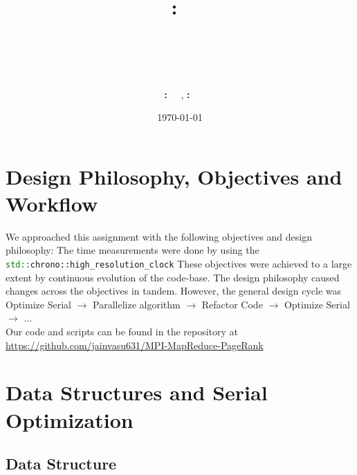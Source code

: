 \documentclass{article}
\title{
    \textmd{\hmwkClass :\ \hmwkClassTitle}\\
    \vspace{2in}
    \textmd{\textbf{\hmwkTitle}}\\
    \textmd{\hmwkSubtitle}\\
    \vspace{3in}
}
\author
{
    \textbf{\hmwkAuthorNameOne:\ \hmwkEntryNumberOne}
    \ ,
    \textbf{\hmwkAuthorNameTwo:\ \hmwkEntryNumberTwo}
}
\date{\today}
\newcommand{\cpp}{\lstinline[language=C++]}
\begin{document}
    
    \maketitle
    \clearpage
    \tableofcontents
    \clearpage
    
    \section{Design Philosophy, Objectives and Workflow}
    
    We approached this assignment with the following objectives and design philosophy:
    The time measurements were done by using the \cpp{std::chrono::high_resolution_clock} 
    These objectives were achieved to a large extent by continuous evolution of the code-base.
    The design philosophy caused changes across the objectives in tandem. However, the general design cycle was \\
    
    Optimize Serial $\longrightarrow$ Parallelize algorithm $\longrightarrow$ Refactor Code $\longrightarrow$ Optimize Serial $\longrightarrow$ ... \\
    
    Our code and scripts can be found in the repository at    \url{https://github.com/jainvasu631/MPI-MapReduce-PageRank}
    \clearpage
    
    \section{Data Structures and Serial Optimization }
    \subsection{Data Structure}
    
\end{document}
